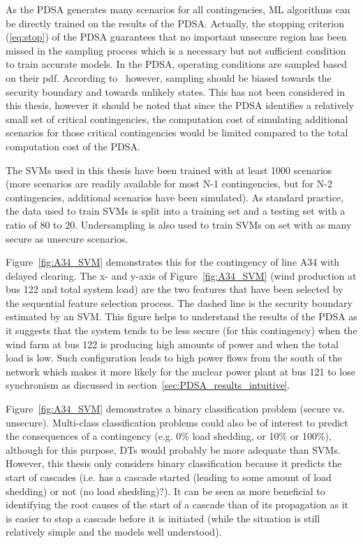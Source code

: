 As the PDSA generates many scenarios for all contingencies, ML algorithms can be directly trained on the results of the PDSA. Actually, the stopping criterion (\ref{eq:stop}) of the PDSA guarantees that no important unsecure region has been missed in the sampling process which is a necessary but not sufficient condition to train accurate models. In the PDSA, operating conditions are sampled based on their pdf. According to~\cite{Bugaje} however, sampling should be biased towards the security boundary and towards unlikely states. This has not been considered in this thesis, however it should be noted that since the PDSA identifies a relatively small set of critical contingencies, the computation cost of simulating additional scenarios for those critical contingencies would be limited compared to the total computation cost of the PDSA.

The SVMs used in this thesis have been trained with at least 1000 scenarios (more scenarios are readily available for most N-1 contingencies, but for N-2 contingencies, additional scenarios have been simulated). As standard practice, the data used to train SVMs is split into a training set and a testing set with a ratio of 80 to 20. Undersampling is also used to train SVMs on set with as many secure as unsecure scenarios.

Figure~\ref{fig:A34_SVM} demonstrates this for the contingency of line A34 with delayed clearing. The x- and y-axis of Figure~\ref{fig:A34_SVM} (wind production at bus 122 and total system load) are the two features that have been selected by the sequential feature selection process. The dashed line is the security boundary estimated by an SVM. This figure helps to understand the results of the PDSA as it suggests that the system tends to be less secure (for this contingency) when the wind farm at bus 122 is producing high amounts of power and when the total load is low. Such configuration leads to high power flows from the south of the network which makes it more likely for the nuclear power plant at bus 121 to lose synchronism as discussed in section~\ref{sec:PDSA_results_intuitive}.

Figure~\ref{fig:A34_SVM} demonstrates a binary classification problem (secure vs. unsecure). Multi-class classification problems could also be of interest to predict the consequences of a contingency (e.g. 0\% load shedding, or 10\% or 100\%), although for this purpose, DTs would probably be more adequate than SVMs. However, this thesis only considers binary classification because it predicts the start of cascades (i.e. has a cascade started (leading to some amount of load shedding) or not (no load shedding)?). It can be seen as more beneficial to identifying the root causes of the start of a cascade than of its propagation as it is easier to stop a cascade before it is initiated (while the situation is still relatively simple and the models well understood).

